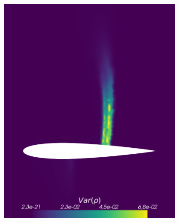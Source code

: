 \begin{figure}[h!]
\begin{subfigure}{0.329\linewidth}
		\includegraphics[width=\linewidth]{figs/Euler1DPlots5/EulerSC5-2Res1e-6_VarRho.png}
		\label{fig:sub1}
	\end{subfigure}%
	\hfill
	\begin{subfigure}{0.329\linewidth}
		\centering

\end{subfigure}
\end{figure}
